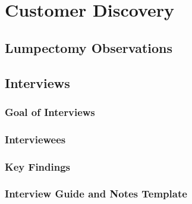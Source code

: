 
\section{Customer Discovery\label{methedology:customerDiscovery}}

\subsection{Lumpectomy Observations\label{sec:methedology:customerDiscovery:lumpectomyObservations}}

\subsection{Interviews\label{sec:methedology:customerDiscovery:interviews}}

\subsubsection{Goal of Interviews\label{sec:methedology:customerDiscovery:interviews:goal}}

\subsubsection{Interviewees\label{sec:methedology:customerDiscovery:interviews:interviewees}}

\subsubsection{Key Findings\label{sec:methedology:customerDiscovery:interviews:keyFindings}}

\subsubsection{Interview Guide and Notes Template\label{sec:methedology:customerDiscovery:interviews:guideAndNotes}}

